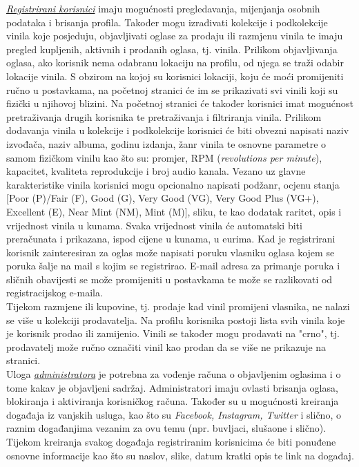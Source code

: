 	 \textit{\underline{Registrirani korisnici}} imaju mogućnosti pregledavanja, mijenjanja osobnih podataka i brisanja profila. Također mogu izrađivati kolekcije i podkolekcije vinila koje posjeduju, objavljivati oglase za prodaju ili razmjenu vinila te imaju pregled kupljenih, aktivnih i prodanih oglasa, tj. vinila. Prilikom objavljivanja oglasa, ako korisnik nema odabranu lokaciju na profilu, od njega se traži odabir lokacije vinila. S obzirom na kojoj su korisnici lokaciji, koju će moći promijeniti ručno u postavkama, na početnoj stranici će im se prikazivati svi vinili koji su fizički u njihovoj blizini. Na početnoj stranici će također korisnici imat mogućnost pretraživanja drugih korisnika te pretraživanja i filtriranja vinila. Prilikom dodavanja vinila u kolekcije i podkolekcije korisnici će biti obvezni napisati naziv izvođača, naziv albuma, godinu izdanja, žanr vinila te osnovne parametre o samom fizičkom vinilu kao što su: promjer, RPM (\textit{revolutions per minute}), kapacitet, kvaliteta reprodukcije i broj audio kanala. Vezano uz glavne karakteristike vinila korisnici mogu opcionalno napisati podžanr, ocjenu stanja [Poor (P)/Fair (F), Good (G), Very Good (VG), Very Good Plus (VG+), Excellent (E), Near Mint (NM), Mint (M)], sliku, te kao dodatak raritet, opis i vrijednost vinila u kunama. Svaka vrijednost vinila će automatski biti preračunata i prikazana, ispod cijene u kunama, u eurima. Kad je registrirani korisnik zainteresiran za oglas može napisati poruku vlasniku oglasa kojem se poruka šalje na mail s kojim se registrirao. E-mail adresa za primanje poruka i sličnih obavijesti se može promijeniti u postavkama te može se razlikovati od registracijskog e-maila.\\
	 
	  \text Tijekom razmjene ili kupovine, tj. prodaje kad vinil promijeni vlasnika, ne nalazi se više u kolekciji prodavatelja. Na profilu korisnika postoji lista svih vinila koje je korisnik prodao ili zamijenio. Vinili se također mogu prodavati na "crno", tj. prodavatelj može ručno označiti vinil kao prodan da se više ne prikazuje na stranici.\\
	 
	 Uloga \textit{\underline{administratora}} je potrebna za vođenje računa o objavljenim oglasima i o tome kakav je objavljeni sadržaj. Administratori imaju ovlasti brisanja oglasa, blokiranja i aktiviranja korisničkog računa. Također su u mogućnosti kreiranja događaja iz vanjskih usluga, kao što su \textit{Facebook, Instagram, Twitter} i slično, o raznim događanjima vezanim za ovu temu (npr. buvljaci, slušaone i slično). Tijekom kreiranja svakog događaja registriranim korisnicima će biti ponuđene osnovne informacije kao što su naslov, slike, datum kratki opis te link na događaj.\\
	 
